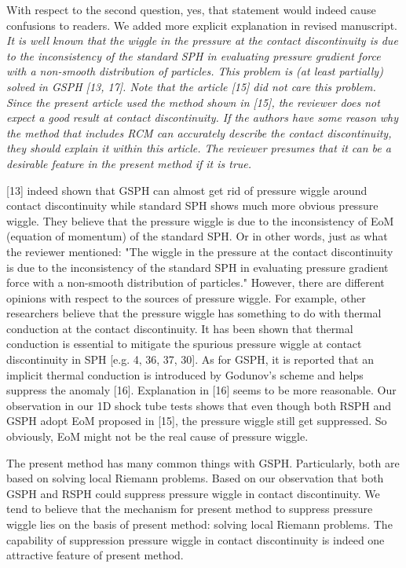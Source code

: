 \documentclass[10pt,a4paper]{article}
\begin{document}
With respect to the second question, yes, that statement would indeed cause confusions to readers. We added more explicit explanation in revised manuscript.
\\[3pt]

\textit {It is well known that the wiggle in the pressure at the contact discontinuity is due to the inconsistency of the standard SPH in evaluating pressure gradient force with a non-smooth distribution of particles. This problem is (at least partially) solved in GSPH [13, 17]. Note that the article [15] did not care this problem. Since the present article used the method shown in [15], the reviewer does not expect a good result at contact discontinuity. If the authors have some reason why the method that includes RCM can accurately describe the contact discontinuity, they should explain it within this article. The reviewer
presumes that it can be a desirable feature in the present method if it is true.}

[13] indeed shown that GSPH can almost get rid of pressure wiggle around contact discontinuity while standard SPH shows much more obvious pressure wiggle. They believe that the pressure wiggle is due to the inconsistency of EoM (equation of momentum) of the standard SPH. Or in other words, just as what the reviewer mentioned: "The wiggle in the pressure at the contact discontinuity is due to the inconsistency of the standard SPH in evaluating pressure gradient force with a non-smooth distribution of particles." However, there are different opinions with respect to the sources of pressure wiggle. For example, other researchers believe that the pressure wiggle has something to do with thermal conduction at the contact discontinuity. It has been shown that thermal conduction is essential to mitigate the spurious pressure wiggle at contact discontinuity in SPH [e.g. 4, 36, 37, 30]. As for GSPH, it is reported that an implicit thermal conduction is introduced by Godunov's scheme and helps suppress the anomaly [16]. Explanation in [16] seems to be more reasonable. Our observation in our 1D shock tube tests shows that even though both RSPH and GSPH adopt EoM proposed in [15], the pressure wiggle still get suppressed. So obviously, EoM might not be the real cause of pressure wiggle. 

The present method has many common things with GSPH. Particularly, both are based on solving local Riemann problems. Based on our observation that both GSPH and RSPH could suppress pressure wiggle in contact discontinuity. We tend to believe that the mechanism for present method to suppress pressure wiggle lies on the basis of present method: solving local Riemann problems. 
The capability of suppression pressure wiggle in contact discontinuity is indeed one attractive feature of present method.
\end{document}
